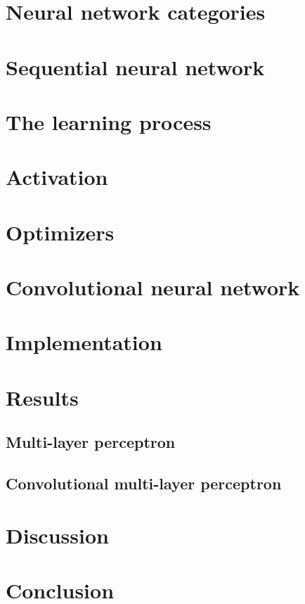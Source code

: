 \documentclass[a4paper, twocolumn, twoside]{article}
\begin{document}
	\section{Neural network categories}

	\section{Sequential neural network}

	\section{The learning process}

	\section{Activation}

	\section{Optimizers}

	\section{Convolutional neural network}

	\section{Implementation}

	\section{Results}

	\subsection{Multi-layer perceptron}

	\subsection{Convolutional multi-layer perceptron}

	\section{Discussion}

	\section{Conclusion}
\end{document}
